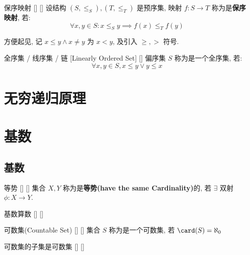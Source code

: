 \documentclass[UTF8]{ctexart}
\begin{document}
    \begin{dfn}
        []
        {保序映射}
        []
        []
        设结构 \((S,\leq_S),(T,\leq_T)\) 是预序集, 映射 \(f:S\to T\) 称为是\textbf{保序映射}, 若: 
        \[\forall x,y\in S: x\leq_S y\implies f(x)\leq_T f(y)\]
    \end{dfn}

    方便起见, 记 \(x\leq y\wedge x\neq y\) 为 \(x<y\), 及引入 \(\geq, >\) 符号. 
    
    \begin{dfn}
        []
        {全序集 / 线序集 / 链}
        [Linearly Ordered Set]
        []
        偏序集  \(S\)  称为是一个全序集, 若: 
        \[\forall x,y\in S, x\leq y\vee y\leq x\]
    \end{dfn}

\section{无穷递归原理}

\section{基数}  

    \subsection{基数}
    
        \begin{dfn}
            []
            {等势}
            []
            []
            集合 \(X,Y\) 称为是\textbf{等势(have the same Cardinality)}的, 若 \(\exists\) 双射 \(\phi:X\to Y\). 
        \end{dfn}
        
        \begin{thm}
            []
            {基数算数}
            []
            []
        \end{thm}
                
            \begin{dfn}
                []
                {可数集(Countable Set)}
                []
                []
                集合 \(S\) 称为是一个可数集, 若 \(\card(S)=\aleph_0\) 
            \end{dfn}
                
            \begin{ppt}
                []
                {可数集的子集是可数集}
                []
                []
            \end{ppt}    
                
\end{document}
